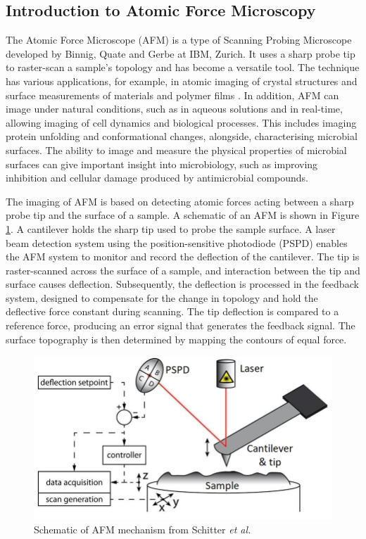\subsection{Introduction to Atomic Force Microscopy}
The Atomic Force Microscope (AFM) is a type of Scanning Probing Microscope\cite{salapaka2008scanning} developed by Binnig, Quate and Gerbe at IBM, Zurich\cite{PhysRevLett.56.930, eaton2010atomic}. It uses a sharp probe tip to raster-scan a sample's topology and has become a versatile tool\cite{JALILI2004907,SANTOS2004133, goken1999microstructural}. The technique has various applications, for example, in atomic imaging of crystal structures \cite{yu2016atomic} and surface measurements of materials and polymer films \cite{passeri2011indentation,d2012evaluation,dallaeva2014afm, acikgoz2020speed,zeng2017novel}. In addition, AFM can image under natural conditions, such as in aqueous solutions and in real-time, allowing imaging of cell dynamics and biological processes. This includes imaging protein unfolding \cite{hughes2016physics} and conformational changes\cite{moody2006atomic}, alongside, characterising microbial surfaces\cite{wright2006application,dufrene2004using}. The ability to image and measure the physical properties of microbial surfaces can give important insight into microbiology, such as improving inhibition and cellular damage produced by antimicrobial compounds\cite{wright2006application, TYAGI2010797}. 

The imaging of AFM is based on detecting atomic forces acting between a sharp probe tip and the surface of a sample. A schematic of an AFM is shown in Figure \ref{fig: AFM mechanism}. A cantilever holds the sharp tip used to probe the sample surface. A laser beam detection system using the position-sensitive photodiode (PSPD) enables the AFM system to monitor and record the deflection of the cantilever. The tip is raster-scanned across the surface of a sample, and interaction between the tip and surface causes deflection. Subsequently, the deflection is processed in the feedback system, designed to compensate for the change in topology and hold the deflective force constant during scanning. The tip deflection is compared to a reference force, producing an error signal that generates the feedback signal. The surface topography is then determined by mapping the contours of equal force\cite{maghsoudy2018review}.

\begin{figure}[H]
    \centering
    \includegraphics[width=0.75\linewidth]{Figures/Schematic-of-an-atomic-force-microscope.png}
    \caption{Schematic of AFM mechanism from Schitter \textit{et al.}\cite{schitter}}
    \label{fig: AFM mechanism}
\end{figure}

